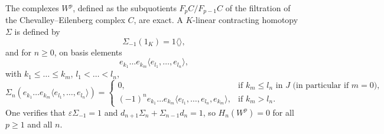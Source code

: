 The complexes $W^p$, defined as the subquotients $F_p C / F_{p-1} C$ of the filtration of the Chevalley--Eilenberg complex $C$, are exact. A $K$-linear contracting homotopy $\Sigma$ is defined by
$$\Sigma_{-1}(1_K) = 1 \langle \rangle,$$
and for $n \geq 0$, on basis elements
$$e_{k_1} \dots e_{k_m} \langle e_{l_1}, \dots, e_{l_n} \rangle,$$
with $k_1 \leq \dots \leq k_m$, $l_1 < \dots < l_n$,
$$\Sigma_n(e_{k_1} \dots e_{k_m} \langle e_{l_1}, \dots, e_{l_n} \rangle) =
\begin{cases}
0, & \text{if } k_m \leq l_n \text{ in } J \text{ (in particular if } m = 0), \\
(-1)^n e_{k_1} \dots e_{k_m} \langle e_{l_1}, \dots, e_{l_n}, e_{k_m} \rangle, & \text{if } k_m > l_n.
\end{cases}$$
One verifies that $\varepsilon \Sigma_{-1} = 1$ and $d_{n+1} \Sigma_n + \Sigma_{n-1} d_n = 1$, so $H_n(W^p) = 0$ for all $p \geq 1$ and all $n$.
